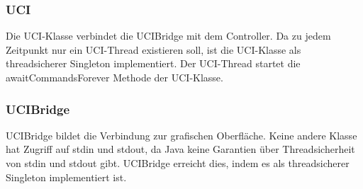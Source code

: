 \subsubsection{UCI}
Die UCI-Klasse verbindet die UCIBridge mit dem Controller.
Da zu jedem Zeitpunkt nur ein UCI-Thread existieren soll, ist die UCI-Klasse als threadsicherer Singleton implementiert.
Der UCI-Thread startet die awaitCommandsForever Methode der UCI-Klasse.

\subsubsection{UCIBridge}
UCIBridge bildet die Verbindung zur grafischen Oberfl\"ache.
Keine andere Klasse hat Zugriff auf stdin und stdout, da Java keine Garantien \"uber Threadsicherheit von stdin und stdout gibt.
UCIBridge erreicht dies, indem es als threadsicherer Singleton implementiert ist.
\pagebreak